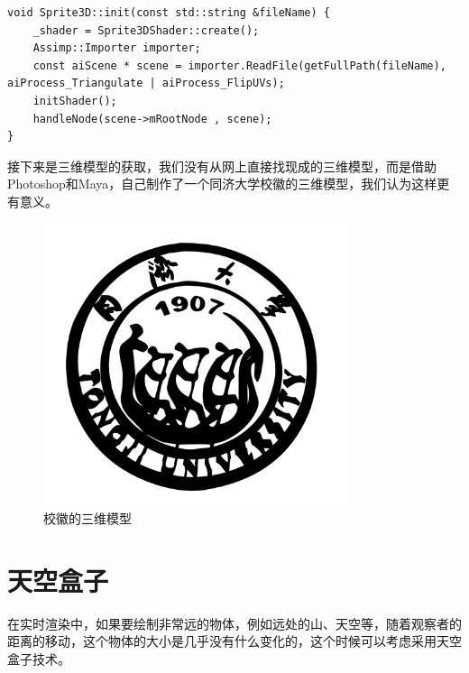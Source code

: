     \begin{lstlisting}
void Sprite3D::init(const std::string &fileName) {
    _shader = Sprite3DShader::create();
    Assimp::Importer importer;
    const aiScene * scene = importer.ReadFile(getFullPath(fileName), aiProcess_Triangulate | aiProcess_FlipUVs);
    initShader();
    handleNode(scene->mRootNode , scene);
}	
    \end{lstlisting}

\begin{spacing}{2.5}
接下来是三维模型的获取，我们没有从网上直接找现成的三维模型，而是借助Photoshop和Maya，自己制作了一个同济大学校徽的三维模型，我们认为这样更有意义。
    \begin{figure}[H]
    	\centering
		\includegraphics[width=0.8\textwidth]{images/tj-logo.png}
		\caption{校徽的三维模型}
		\label{shininess}
    \end{figure}
\end{spacing}


    \section{天空盒子}
            \begin{spacing}{2.5}
            	     在实时渲染中，如果要绘制非常远的物体，例如远处的山、天空等，随着观察者的距离的移动，这个物体的大小是几乎没有什么变化的，这个时候可以考虑采用天空盒子技术。
            \end{spacing}


